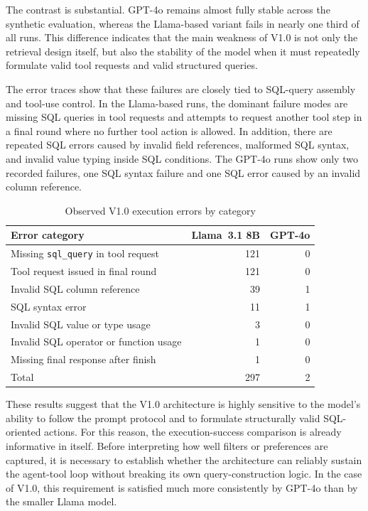The contrast is substantial. GPT-4o remains almost fully stable across the synthetic evaluation, whereas the Llama-based variant fails in nearly one third of all runs. This difference indicates that the main weakness of V1.0 is not only the retrieval design itself, but also the stability of the model when it must repeatedly formulate valid tool requests and valid structured queries.

The error traces show that these failures are closely tied to SQL-query assembly and tool-use control. In the Llama-based runs, the dominant failure modes are missing SQL queries in tool requests and attempts to request another tool step in a final round where no further tool action is allowed. In addition, there are repeated SQL errors caused by invalid field references, malformed SQL syntax, and invalid value typing inside SQL conditions. The GPT-4o runs show only two recorded failures, one SQL syntax failure and one SQL error caused by an invalid column reference.

\begin{table}[htbp]
\centering
\begin{tabular}{lrr}
\hline
Error category & Llama~3.1 8B & GPT-4o \\
\hline
Missing \texttt{sql\_query} in tool request & 121 & 0 \\
Tool request issued in final round & 121 & 0 \\
Invalid SQL column reference & 39 & 1 \\
SQL syntax error & 11 & 1 \\
Invalid SQL value or type usage & 3 & 0 \\
Invalid SQL operator or function usage & 1 & 0 \\
Missing final response after finish & 1 & 0 \\
\hline
Total & 297 & 2 \\
\hline
\end{tabular}
\caption{Observed V1.0 execution errors by category}
\label{table:recommendation-generation:v1-0-error-categories}
\end{table}

These results suggest that the V1.0 architecture is highly sensitive to the model's ability to follow the prompt protocol and to formulate structurally valid SQL-oriented actions. For this reason, the execution-success comparison is already informative in itself. Before interpreting how well filters or preferences are captured, it is necessary to establish whether the architecture can reliably sustain the agent-tool loop without breaking its own query-construction logic. In the case of V1.0, this requirement is satisfied much more consistently by GPT-4o than by the smaller Llama model.

